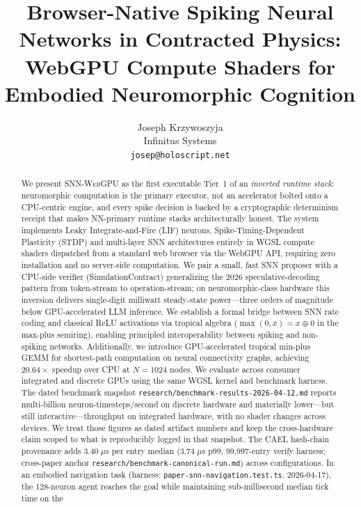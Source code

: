 \documentclass[10pt]{article}
\title{Browser-Native Spiking Neural Networks in Contracted Physics:\\
       WebGPU Compute Shaders for Embodied Neuromorphic Cognition}
\author{
  Joseph Krzywoszyja \\
  Infinitus Systems \\
  \texttt{josep@holoscript.net} \\
}
\newcommand{\snnwebgpu}{\textsc{SNN-WebGPU}}
\newcommand{\cael}{\textsc{CAEL}}
\newcommand{\tropplus}{\oplus}
\begin{document}
\maketitle

\begin{abstract}
We present \snnwebgpu{} as the first executable Tier~1 of an \emph{inverted
runtime stack}: neuromorphic computation is the primary executor, not an
accelerator bolted onto a CPU-centric engine, and every spike decision is backed
by a cryptographic determinism receipt that makes NN-primary runtime stacks
architecturally honest.
The system implements Leaky Integrate-and-Fire (LIF) neurons, Spike-Timing-Dependent
Plasticity (STDP) and multi-layer SNN architectures entirely in WGSL compute
shaders dispatched from a standard web browser via the WebGPU API, requiring
zero installation and no server-side computation.
We pair a small, fast SNN proposer with a CPU-side verifier
(SimulationContract) generalizing the 2026 speculative-decoding pattern from
token-stream to operation-stream; on neuromorphic-class hardware this inversion
delivers single-digit milliwatt steady-state power---three orders of magnitude
below GPU-accelerated LLM inference.
We establish a formal bridge between SNN rate coding and classical ReLU activations
via tropical algebra ($\max(0,x) = x \tropplus 0$ in the max-plus semiring),
enabling principled interoperability between spiking and non-spiking networks.
Additionally, we introduce GPU-accelerated tropical min-plus GEMM for shortest-path
computation on neural connectivity graphs, achieving $20.64\times$ speedup over
CPU at $N=1024$ nodes.
We evaluate across consumer integrated and discrete GPUs using the same WGSL
kernel and benchmark harness. The dated benchmark snapshot
\texttt{research/benchmark-results-2026-04-12.md} reports multi-billion
neuron-timesteps/second on discrete hardware and materially lower---but still
interactive---throughput on integrated hardware, with no shader changes across
devices. We treat those figures as dated artifact numbers and keep the
cross-hardware claim scoped to what is reproducibly logged in that snapshot.
The \cael{} hash-chain provenance adds $3.40\;\mu$s per entry median
($3.74\;\mu$s p99, 99{,}997-entry verify harness; cross-paper anchor
\texttt{research/benchmark-canonical-run.md}) across configurations.
In an embodied navigation task (harness:
\texttt{paper-snn-navigation.test.ts}, 2026-04-17), the 128-neuron agent
reaches the goal while maintaining sub-millisecond median tick time on the

\end{abstract}
\end{document}
